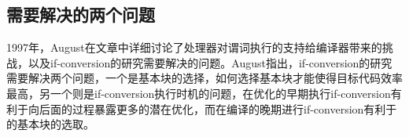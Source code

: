 \subsection{需要解决的两个问题}

1997年，August在文章中详细讨论了处理器对谓词执行的支持给编译器带来的挑战，以及if-conversion的研究需要解决的问题\cite{August1997}。August指出，if-conversion的研究需要解决两个问题，一个是基本块的选择，如何选择基本块才能使得目标代码效率最高，另一个则是if-conversion执行时机的问题，在优化的早期执行if-conversion有利于向后面的过程暴露更多的潜在优化，而在编译的晚期进行if-conversion有利于的基本块的选取。